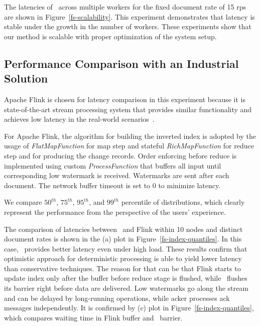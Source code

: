 The latencies of \FlameStream\ across multiple workers for the fixed document rate of 15 rps are shown in Figure~\ref{fs-scalability}. This experiment demonstrates that latency is stable  under  the growth in the number of workers. These experiments show that our method is scalable with proper  optimization of  the system setup.

\subsection{Performance Comparison with an Industrial Solution}

Apache Flink is chosen for latency comparison in this experiment  because it is state-of-the-art stream processing system that provides similar functionality and achieves low latency in the real-world scenarios~\cite{S7530084}. 

For Apache Flink, the algorithm for building the inverted index is adopted by the usage of {\it FlatMapFunction} for map step and stateful {\it RichMapFunction} for reduce step and for producing the change records. Order enforcing before reduce is implemented using custom {\it ProcessFunction} that buffers all input until corresponding low watermark is received. Watermarks are sent after each document. The network buffer timeout is set to 0 to minimize latency.

We compare $50^{th}$, $75^{th}$, $95^{th}$, and $99^{th}$ percentile of distributions, which clearly represent the performance from the perspective of the users' experience.

The comparison of latencies between \FlameStream\ and Flink within 10 nodes and distinct document rates is shown in the (a) plot in Figure~\ref{fs-index-quantiles}. In this case, \FlameStream\ provides better  latency even under high load. These results confirm that optimistic approach for deterministic processing is able to yield  lower  latency than conservative techniques. The  reason for that  can be that Flink starts to update index only after the buffer before reduce stage is flushed, while  \FlameStream\ flushes its barrier right before data are delivered. Low watermarks go along the stream and can be delayed by long-running operations, while acker processes ack messages independently. It is confirmed by (c) plot in Figure~\ref{fs-index-quantiles}, which compares  waiting time in Flink buffer and \FlameStream\ barrier.


